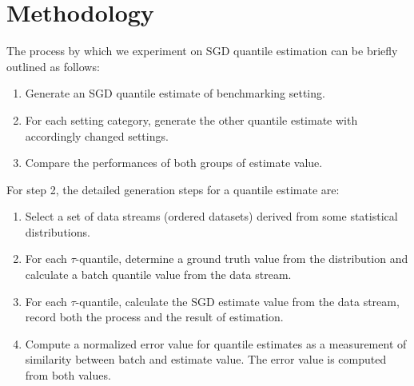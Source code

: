 \section{Methodology}
\label{sec: methodology}
The process by which we experiment on SGD quantile estimation can be briefly outlined as follows:
\begin{enumerate}
    \item Generate an SGD quantile estimate of benchmarking setting.
    \item For each setting category, generate the other quantile estimate with accordingly changed settings.
    \item Compare the performances of both groups of estimate value.
\end{enumerate}
For step 2, the detailed generation steps for a quantile estimate are:
\begin{enumerate}[label=(\roman*)]
    \item Select a set of data streams (ordered datasets) derived from some statistical distributions.
    \item For each $\tau$-quantile, determine a ground truth value from the distribution and calculate a batch quantile value from the data stream.
    \item For each $\tau$-quantile, calculate the SGD estimate value from the data stream, record both the process and the result of estimation.
    \item Compute a normalized error value for quantile estimates as a measurement of similarity between batch and estimate value. The error value is computed from both values.
\end{enumerate}

